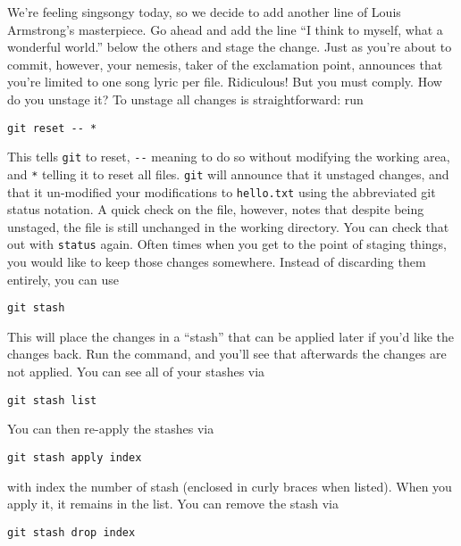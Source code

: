 \par{
We're feeling singsongy today, so we decide to add another line of Louis
Armstrong's masterpiece. Go ahead and add the line ``I think to myself, what a
wonderful world.'' below the others and stage the change. Just as you're about
to commit, however, your nemesis, taker of the exclamation point, announces
that you're limited to one song lyric per file. Ridiculous! But you must
comply. How do you unstage it? To unstage all changes is straightforward: run
}

\begin{verbatim}
git reset -- *
\end{verbatim}

\par{
This tells \verb+git+ to reset, \verb+--+ meaning to do so without modifying
the working area, and \verb+*+ telling it to reset all files.
\verb+git+ will announce that it unstaged changes, and that it un-modified
your modifications to \verb+hello.txt+ using the abbreviated git status
notation. A quick check on the file, however, notes that despite being
unstaged, the file is still unchanged in the working directory. You can check
that out with \verb+status+ again. Often times when you get to the point of
staging things, you would like to keep those changes somewhere. Instead of
discarding them entirely, you can use
}

\begin{verbatim}
git stash
\end{verbatim}

\par{
This will place the changes in a ``stash'' that can be applied later if you'd
like the changes back. Run the command, and you'll see that afterwards the
changes are not applied. You can see all of your stashes via
}

\begin{verbatim}
git stash list
\end{verbatim}

\par{
You can then re-apply the stashes via
}

\begin{verbatim}
git stash apply index
\end{verbatim}

\par{
with index the number of stash (enclosed in curly braces when listed). 
When you apply it, it remains in the list. You can remove the stash via
}

\begin{verbatim}
git stash drop index
\end{verbatim}

